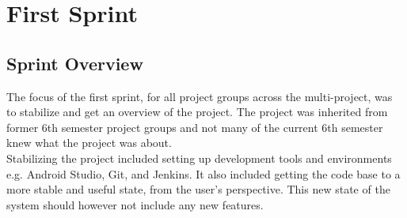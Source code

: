 \part{First Sprint}
\label{par:first_sprint}

\chapter{Sprint Overview}
The focus of the first sprint, for all project groups across the multi-project, was to stabilize and get an overview of the project. The project was inherited from former 6th semester project groups and not many of the current 6th semester knew what the \giraf project was about.
\\
Stabilizing the project included setting up development tools and environments e.g. Android Studio, Git, and Jenkins. It also included getting the code base to a more stable and useful state, from the user's perspective. This new state of the system should however not include any new features.









